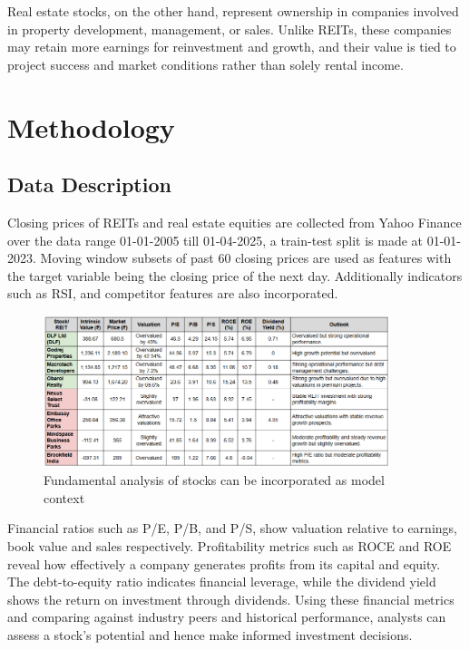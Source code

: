\documentclass[11pt]{article}
\begin{document}
Real estate stocks, on the other hand, represent ownership in companies involved in property development, management, or sales. Unlike REITs, these companies may retain more earnings for reinvestment and growth, and their value is tied to project success and market conditions rather than solely rental income.


\section{Methodology}
\label{sec:methodology}

\subsection{Data Description}
Closing prices of REITs and real estate equities are collected from Yahoo Finance over the data range 01-01-2005 till 01-04-2025, a train-test split is made at 01-01-2023. Moving window subsets of past 60 closing prices are used as features with the target variable being the closing price of the next day. Additionally indicators such as RSI, and competitor features are also incorporated.\cite{1}

\begin{figure}[htbp]
    \centering
    \includegraphics[width=0.9\textwidth]{figures/markt_summary.png}
    \caption{Fundamental analysis of stocks can be incorporated as model context}
    \label{fig:sample}
\end{figure}

Financial ratios such as P/E, P/B, and P/S, show valuation relative to earnings, book value and sales respectively. Profitability metrics such as ROCE and ROE reveal how effectively a company generates profits from its capital and equity. The debt-to-equity ratio indicates financial leverage, while the dividend yield shows the return on investment through dividends.\cite{2}
Using these financial metrics and comparing against industry peers and historical performance, analysts can assess a stock’s potential and hence make informed investment decisions.\cite{6}
\end{document}
